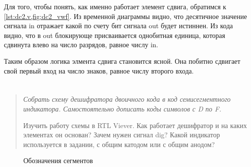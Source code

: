 Для того, чтобы понять, как именно работает элемент сдвига, обратимся к \cref{lst:dc2.v,fig:dc2_vwf}. Из временной диаграммы видно, что десятичное значение сигнала in отражает какой по счету бит сигнала out будет истиннен. Из кода видно, что в out блокирующе присваивается однобитная единица, которая сдвинута влево на число разрядов, равное числу in.

Таким образом логика элмента сдвига становится ясной. Она побитно сдвигает свой первый вход на число знаков, равное числу второго входа.

\section*{  }
\begin{quote}
    {\itshape
        Собрать схему дешифратора двоичного кода в код семисегментного индикатора. Самостоятельно дописать коды символов с D по F.

        Изучить работу схемы в RTL Viever. Как работает дешифратор и на каких элементах он основан? Зачем нужен сигнал dig? Какой индикатор используется в задании, с общим катодом или с общим анодом?
    }
\end{quote}

\begin{figure}[H]
    \centering
    \caption{Обозначения сегментов}
    \label{fig:segments}
\end{figure}

